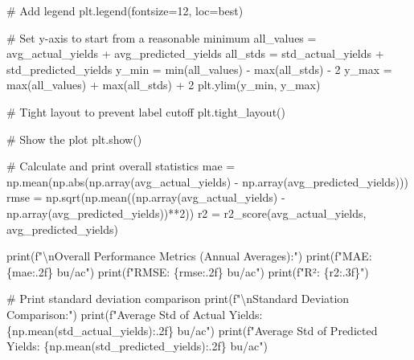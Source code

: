 \documentclass[
  letterpaper,
  DIV=11,
  numbers=noendperiod]{scrreprt}
\newenvironment{Shaded}{\begin{snugshade}}{\end{snugshade}}
\newcommand{\BuiltInTok}[1]{\textcolor[rgb]{0.00,0.23,0.31}{#1}}
\newcommand{\CharTok}[1]{\textcolor[rgb]{0.13,0.47,0.30}{#1}}
\newcommand{\CommentTok}[1]{\textcolor[rgb]{0.37,0.37,0.37}{#1}}
\newcommand{\DecValTok}[1]{\textcolor[rgb]{0.68,0.00,0.00}{#1}}
\newcommand{\NormalTok}[1]{\textcolor[rgb]{0.00,0.23,0.31}{#1}}
\newcommand{\OperatorTok}[1]{\textcolor[rgb]{0.37,0.37,0.37}{#1}}
\newcommand{\SpecialCharTok}[1]{\textcolor[rgb]{0.37,0.37,0.37}{#1}}
\newcommand{\SpecialStringTok}[1]{\textcolor[rgb]{0.13,0.47,0.30}{#1}}
\newcommand{\StringTok}[1]{\textcolor[rgb]{0.13,0.47,0.30}{#1}}
\begin{document}
\begin{Shaded}
\begin{Highlighting}[]
    \CommentTok{\# Add legend}
\NormalTok{    plt.legend(fontsize}\OperatorTok{=}\DecValTok{12}\NormalTok{, loc}\OperatorTok{=}\StringTok{\textquotesingle{}best\textquotesingle{}}\NormalTok{)}

    \CommentTok{\# Set y{-}axis to start from a reasonable minimum}
\NormalTok{    all\_values }\OperatorTok{=}\NormalTok{ avg\_actual\_yields }\OperatorTok{+}\NormalTok{ avg\_predicted\_yields}
\NormalTok{    all\_stds }\OperatorTok{=}\NormalTok{ std\_actual\_yields }\OperatorTok{+}\NormalTok{ std\_predicted\_yields}
\NormalTok{    y\_min }\OperatorTok{=} \BuiltInTok{min}\NormalTok{(all\_values) }\OperatorTok{{-}} \BuiltInTok{max}\NormalTok{(all\_stds) }\OperatorTok{{-}} \DecValTok{2}
\NormalTok{    y\_max }\OperatorTok{=} \BuiltInTok{max}\NormalTok{(all\_values) }\OperatorTok{+} \BuiltInTok{max}\NormalTok{(all\_stds) }\OperatorTok{+} \DecValTok{2}
\NormalTok{    plt.ylim(y\_min, y\_max)}

    \CommentTok{\# Tight layout to prevent label cutoff}
\NormalTok{    plt.tight\_layout()}

    \CommentTok{\# Show the plot}
\NormalTok{    plt.show()}

    \CommentTok{\# Calculate and print overall statistics}
\NormalTok{    mae }\OperatorTok{=}\NormalTok{ np.mean(np.}\BuiltInTok{abs}\NormalTok{(np.array(avg\_actual\_yields) }\OperatorTok{{-}}\NormalTok{ np.array(avg\_predicted\_yields)))}
\NormalTok{    rmse }\OperatorTok{=}\NormalTok{ np.sqrt(np.mean((np.array(avg\_actual\_yields) }\OperatorTok{{-}}\NormalTok{ np.array(avg\_predicted\_yields))}\OperatorTok{**}\DecValTok{2}\NormalTok{))}
\NormalTok{    r2 }\OperatorTok{=}\NormalTok{ r2\_score(avg\_actual\_yields, avg\_predicted\_yields)}

    \BuiltInTok{print}\NormalTok{(}\SpecialStringTok{f"}\CharTok{\textbackslash{}n}\SpecialStringTok{Overall Performance Metrics (Annual Averages):"}\NormalTok{)}
    \BuiltInTok{print}\NormalTok{(}\SpecialStringTok{f"MAE: }\SpecialCharTok{\{}\NormalTok{mae}\SpecialCharTok{:.2f\}}\SpecialStringTok{ bu/ac"}\NormalTok{)}
    \BuiltInTok{print}\NormalTok{(}\SpecialStringTok{f"RMSE: }\SpecialCharTok{\{}\NormalTok{rmse}\SpecialCharTok{:.2f\}}\SpecialStringTok{ bu/ac"}\NormalTok{)}
    \BuiltInTok{print}\NormalTok{(}\SpecialStringTok{f"R²: }\SpecialCharTok{\{}\NormalTok{r2}\SpecialCharTok{:.3f\}}\SpecialStringTok{"}\NormalTok{)}

    \CommentTok{\# Print standard deviation comparison}
    \BuiltInTok{print}\NormalTok{(}\SpecialStringTok{f"}\CharTok{\textbackslash{}n}\SpecialStringTok{Standard Deviation Comparison:"}\NormalTok{)}
    \BuiltInTok{print}\NormalTok{(}\SpecialStringTok{f"Average Std of Actual Yields: }\SpecialCharTok{\{}\NormalTok{np}\SpecialCharTok{.}\NormalTok{mean(std\_actual\_yields)}\SpecialCharTok{:.2f\}}\SpecialStringTok{ bu/ac"}\NormalTok{)}
    \BuiltInTok{print}\NormalTok{(}\SpecialStringTok{f"Average Std of Predicted Yields: }\SpecialCharTok{\{}\NormalTok{np}\SpecialCharTok{.}\NormalTok{mean(std\_predicted\_yields)}\SpecialCharTok{:.2f\}}\SpecialStringTok{ bu/ac"}\NormalTok{)}


\end{Highlighting}
\end{Shaded}
\end{document}
